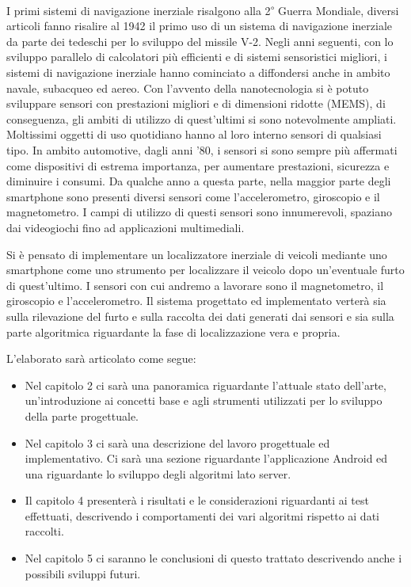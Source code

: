 \documentclass[12pt,a4paper,openright,twoside]{report}
\begin{document}
I primi sistemi di navigazione inerziale risalgono alla 2\textsuperscript{$\circ$} Guerra Mondiale, diversi articoli \cite{K1} fanno risalire al 1942 il primo uso di un sistema di navigazione inerziale da parte dei tedeschi per lo sviluppo del missile V-2. Negli anni seguenti, con lo sviluppo parallelo di calcolatori più efficienti e di sistemi sensoristici migliori, i sistemi di navigazione inerziale hanno cominciato a diffondersi anche in ambito navale, subacqueo ed aereo. Con l'avvento della nanotecnologia si è potuto sviluppare sensori con prestazioni migliori e di dimensioni ridotte (MEMS), di conseguenza, gli ambiti di utilizzo di quest'ultimi si sono notevolmente ampliati. 
Moltissimi oggetti di uso quotidiano hanno al loro interno sensori di qualsiasi tipo. In ambito automotive, dagli anni '80, i sensori si sono sempre più affermati come dispositivi di estrema importanza, per aumentare prestazioni, sicurezza e diminuire i consumi. 
Da qualche anno a questa parte, nella maggior parte degli smartphone sono presenti diversi sensori come l'accelerometro, giroscopio e il magnetometro. I campi di utilizzo di questi sensori sono innumerevoli, spaziano dai videogiochi fino ad applicazioni multimediali.

Si è pensato di implementare un localizzatore inerziale di veicoli mediante uno smartphone come uno strumento per localizzare il veicolo dopo un'eventuale furto di quest'ultimo. I sensori con cui andremo a lavorare sono il magnetometro, il giroscopio e l'accelerometro. Il sistema progettato ed implementato verterà sia sulla rilevazione del furto e sulla raccolta dei dati generati dai sensori e sia sulla parte algoritmica riguardante la fase di localizzazione vera e propria.

L'elaborato sarà articolato come segue:

\begin{itemize}
\item Nel capitolo 2 ci sarà una panoramica riguardante l'attuale stato dell'arte, un'introduzione ai concetti base e agli strumenti utilizzati per lo sviluppo della parte progettuale.
\item Nel capitolo 3 ci sarà una descrizione del lavoro progettuale ed implementativo. Ci sarà una sezione riguardante l'applicazione Android ed una riguardante lo sviluppo degli algoritmi lato server.
\item Il capitolo 4 presenterà i risultati e le considerazioni riguardanti ai test effettuati, descrivendo i comportamenti dei vari algoritmi rispetto ai dati raccolti.
\item Nel capitolo 5 ci saranno le conclusioni di questo trattato descrivendo anche i possibili sviluppi futuri.
\end{itemize}
\end{document}
